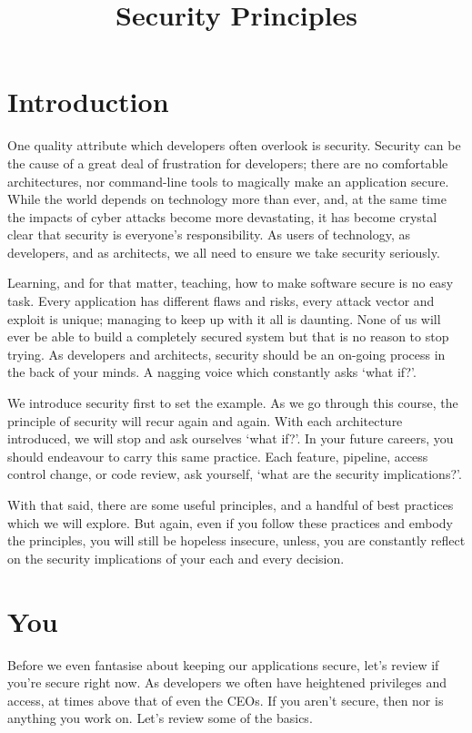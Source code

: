 \title{Security Principles}
\maketitle

\section{Introduction}

One quality attribute which developers often overlook is security.
Security can be the cause of a great deal of frustration for developers;
there are no comfortable architectures, nor command-line tools to magically make an application secure.
While the world depends on technology more than ever, and, at the same time the impacts of cyber attacks become more devastating,
it has become crystal clear that security is everyone's responsibility.
As users of technology, as developers, and as architects, we all need to ensure we take security seriously.

Learning, and for that matter, teaching, how to make software secure is no easy task.
Every application has different flaws and risks, every attack vector and exploit is unique; managing to keep up with it all is daunting.
None of us will ever be able to build a completely secured system but that is no reason to stop trying.
As developers and architects, security should be an on-going process in the back of your minds.
A nagging voice which constantly asks `what if?'.

We introduce security first to set the example.
As we go through this course, the principle of security will recur again and again.
With each architecture introduced, we will stop and ask ourselves `what if?'.
In your future careers, you should endeavour to carry this same practice.
Each feature, pipeline, access control change, or code review, ask yourself, `what are the security implications?'.

With that said, there are some useful principles, and a handful of best practices which we will explore.
But again, even if you follow these practices and embody the principles,
you will still be hopeless insecure, unless,
you are constantly reflect on the security implications of your each and every decision.

\section{You}
Before we even fantasise about keeping our applications secure, let's review if you're secure right now.
As developers we often have heightened privileges and access, at times above that of even the CEOs.
If you aren't secure, then nor is anything you work on.
Let's review some of the basics.

